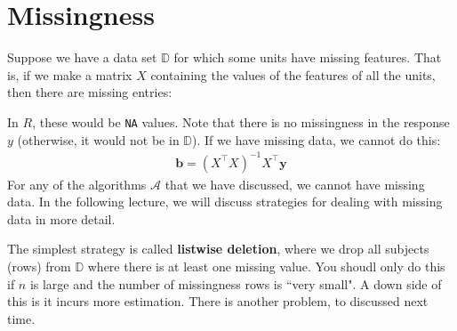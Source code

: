 \documentclass[12pt, a4paper]{article}
\theoremstyle{definition}
\begin{document}
	\section*{Missingness}
	Suppose we have a data set $\mathbb{D}$ for which some units have missing features.
	That is, if we make a matrix $X$ containing the values of the features of all
	the units, then there are missing entries:
	
	In $R$, these would be \texttt{NA} values. Note that there is no missingness
	in the response $y$ (otherwise, it would not be in $\mathbb{D}$). If we have
	missing data, we cannot do this:
	\begin{align*}
		\bm{b} = (X^\top X)^{-1} X^\top \bm{y}
	\end{align*}
	For any of the algorithms $\mathcal{A}$ that we have discussed, we cannot have missing data.
	In the following lecture, we will discuss strategies for dealing with missing data in
	more detail.
	
	The simplest strategy is called \textbf{listwise deletion}, where we drop all subjects (rows)
	from $\mathbb{D}$ where there is at least one missing value. You shoudl only do this
	if $n$ is large and the number of missingness rows is ``very small". A down side of
	this is it incurs more estimation. There is another problem, to discussed next time.
\end{document}

